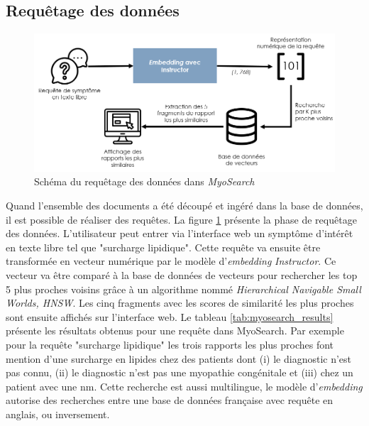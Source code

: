 \subsection{Requêtage des données}
\begin{figure}[!ht]
 \centering
 \includegraphics[width=1\textwidth]{figures/myosearch_query.png}
 \caption[Requêtage des données dans \textit{MyoSearch}]{Schéma du requêtage des données dans \textit{MyoSearch}}
 \label{fig:myosearch_query}
\end{figure}
Quand l'ensemble des documents a été découpé et ingéré dans la base de données, il est possible de réaliser des requêtes. La figure \ref{fig:myosearch_query} présente la phase de requêtage des données. L'utilisateur peut entrer via l'interface web un symptôme d'intérêt en texte libre tel que "surcharge lipidique". Cette requête va ensuite être transformée en vecteur numérique par le modèle d'\textit{embedding }\textit{Instructor}. Ce vecteur va être comparé à la base de données de vecteurs pour rechercher les top 5 plus proches voisins grâce à un algorithme nommé \textit{Hierarchical Navigable Small Worlds, HNSW}. Les cinq fragments avec les scores de similarité les plus proches sont ensuite affichés sur l'interface web. Le tableau \ref{tab:myosearch_results} présente les résultats obtenus pour une requête dans MyoSearch. Par exemple pour la requête "surcharge lipidique" les trois rapports les plus proches font mention d'une surcharge en lipides chez des patients dont (i) le diagnostic n'est pas connu, (ii) le diagnostic n'est pas une myopathie congénitale et (iii) chez un patient avec une \gls{nm}. Cette recherche est aussi multilingue, le modèle d'\textit{embedding} autorise des recherches entre une base de données française avec requête en anglais, ou inversement.

